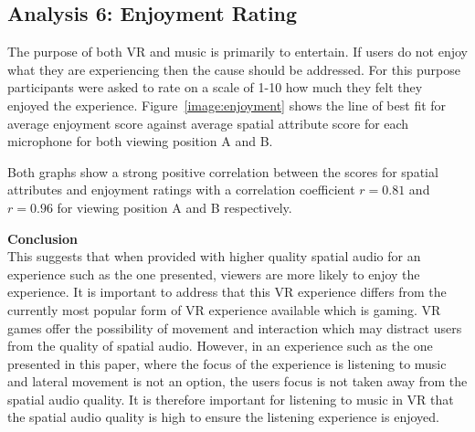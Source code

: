 















\subsection{Analysis 6: Enjoyment Rating}

	The purpose of both VR and music is primarily to entertain. If users do not enjoy what they are experiencing then the cause should be addressed. For this purpose participants were asked to rate on a scale of 1-10 how much they felt they enjoyed the experience. Figure~\ref{image:enjoyment} shows the line of best fit for average enjoyment score against average spatial attribute score for each microphone for both viewing position A and B.
	
	Both graphs show a strong positive correlation between the scores for spatial attributes and enjoyment ratings with a correlation coefficient $r = 0.81$ and $r = 0.96$ for viewing position A and B respectively.

	\textbf{Conclusion} \\
	This suggests that when provided with higher quality spatial audio for an experience such as the one presented, viewers are more likely to enjoy the experience. It is important to address that this VR experience differs from the currently most popular form of VR experience available which is gaming. VR games offer the possibility of movement and interaction which may distract users from the quality of spatial audio. However, in an experience such as the one presented in this paper, where the focus of the experience is listening to music and lateral movement is not an option, the users focus is not taken away from the spatial audio quality. It is therefore important for listening to music in VR that the spatial audio quality is high to ensure the listening experience is enjoyed.



